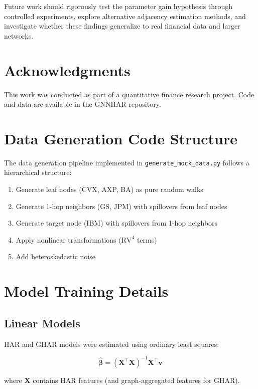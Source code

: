 \documentclass[10pt,a4paper]{article}
\newcommand{\RV}{\text{RV}}
\begin{document}
Future work should rigorously test the parameter gain hypothesis through controlled experiments, explore alternative adjacency estimation methods, and investigate whether these findings generalize to real financial data and larger networks.

\section*{Acknowledgments}

This work was conducted as part of a quantitative finance research project. Code and data are available in the GNNHAR repository.

\appendix

\section{Data Generation Code Structure}

The data generation pipeline implemented in \texttt{generate\_mock\_data.py} follows a hierarchical structure:

\begin{enumerate}
\item Generate leaf nodes (CVX, AXP, BA) as pure random walks
\item Generate 1-hop neighbors (GS, JPM) with spillovers from leaf nodes
\item Generate target node (IBM) with spillovers from 1-hop neighbors
\item Apply nonlinear transformations ($\RV^4$ terms)
\item Add heteroskedastic noise
\end{enumerate}

\section{Model Training Details}

\subsection{Linear Models}

HAR and GHAR models were estimated using ordinary least squares:

\begin{equation}
\hat{\boldsymbol{\beta}} = (\boldsymbol{X}^\top \boldsymbol{X})^{-1} \boldsymbol{X}^\top \boldsymbol{v}
\end{equation}

where $\boldsymbol{X}$ contains HAR features (and graph-aggregated features for GHAR).
\end{document}
